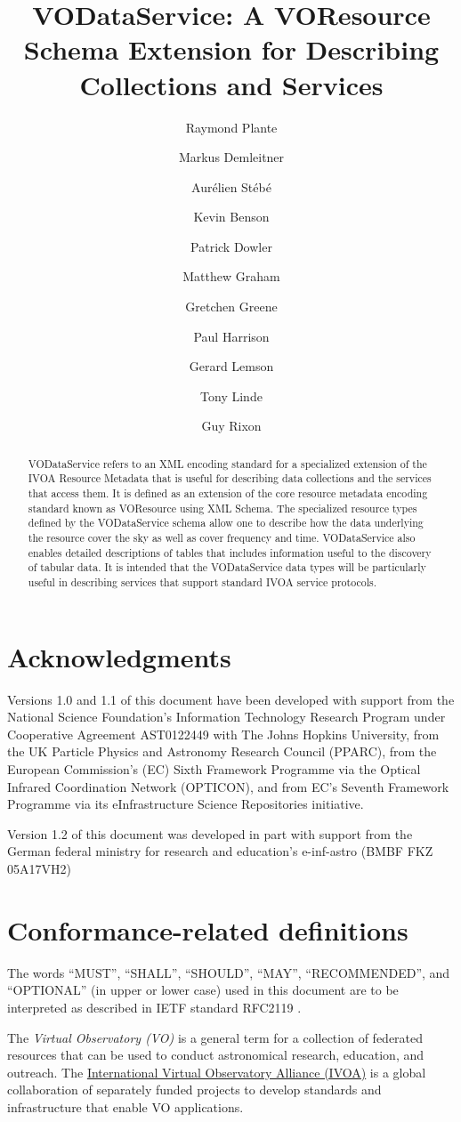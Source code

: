 \documentclass[11pt,a4paper]{ivoa}
\title{VODataService: A VOResource Schema Extension for Describing
Collections and Services}
\author[http://www.ivoa.net/twiki/bin/view/IVOA/RayPlante]{Raymond Plante}
\author[http://www.ivoa.net/twiki/bin/view/IVOA/MarkusDemleitner]{Markus Demleitner}
\author[http://www.ivoa.net/twiki/bin/view/IVOA/AurelienStebe]{Aurélien Stébé}
\author[http://www.ivoa.net/twiki/bin/view/IVOA/KevinBenson]{Kevin Benson}
\author[http://www.ivoa.net/twiki/bin/view/IVOA/PatrickDowler]{Patrick Dowler}
\author[http://www.ivoa.net/twiki/bin/view/IVOA/MatthewGraham]{Matthew Graham}
\author[http://www.ivoa.net/twiki/bin/view/IVOA/GretchenGreene]{Gretchen Greene}
\author[http://www.ivoa.net/twiki/bin/view/IVOA/PaulHarrison]{Paul Harrison}
\author[http://www.ivoa.net/twiki/bin/view/IVOA/GerardLemson]{Gerard Lemson}
\author[http://www.ivoa.net/twiki/bin/view/IVOA/TonyLinde]{Tony Linde}
\author[http://www.ivoa.net/twiki/bin/view/IVOA/GuyRixon]{Guy Rixon}
\begin{document}
\begin{abstract}
VODataService refers to an XML encoding standard for a specialized
extension of the IVOA Resource Metadata that is useful for describing
data collections and the services that access them.  It is defined as
an extension of the core resource metadata encoding standard known as
VOResource \citep{2008ivoa.spec.0222P} using XML Schema.
The specialized resource types defined by the VODataService schema
allow one to describe how the data underlying the resource cover the
sky as well as cover frequency and time.  
VODataService also enables detailed
descriptions of tables that includes information useful to the
discovery of tabular data.  It is intended that the VODataService data
types will be particularly useful in describing services that support
standard IVOA service protocols.  
\end{abstract}

\section*{Acknowledgments}

Versions 1.0 and 1.1 of this document have been developed with support from the
National Science Foundation's
Information Technology Research Program under Cooperative Agreement
AST0122449 with The Johns Hopkins University, from the
UK Particle Physics and Astronomy
Research Council (PPARC), from the European Commission's (EC)
Sixth
Framework Programme via the 
Optical Infrared Coordination Network (OPTICON), and from EC's
Seventh Framework Programme
via its
eInfrastructure Science Repositories initiative.

Version 1.2 of this document was developed in part with support from the
German federal ministry for research and education's e-inf-astro (BMBF
FKZ 05A17VH2)


\section*{Conformance-related definitions}

The words ``MUST'', ``SHALL'', ``SHOULD'', ``MAY'', ``RECOMMENDED'', and
``OPTIONAL'' (in upper or lower case) used in this document are to be
interpreted as described in IETF standard RFC2119 \citep{std:RFC2119}.

The \emph{Virtual Observatory (VO)} is a
general term for a collection of federated resources that can be used
to conduct astronomical research, education, and outreach.
The \href{http://www.ivoa.net}{International
Virtual Observatory Alliance (IVOA)} is a global
collaboration of separately funded projects to develop standards and
infrastructure that enable VO applications.
\end{document}
